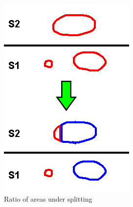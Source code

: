 \documentclass[11p, titlepage]{article}
\begin{document}
\begin{figure}[h!]
     \centering
     \begin{subfigure}[b]{0.35\textwidth}
         \centering
         \includegraphics[width=\textwidth]{diagrams/ratio_of_area}
         \caption{Ratio of areas under splitting}
         \label{fig:ratio_of_area}
     \end{subfigure}
     \hfill
     \begin{subfigure}[b]{0.35\textwidth}
         \centering

\end{subfigure}
\end{figure}
\end{document}
